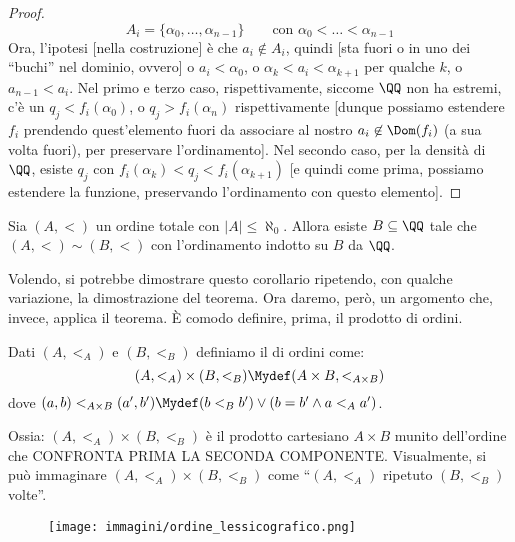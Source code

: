 \documentclass[11pt]{scrartcl}
\begin{document}
\begin{proof}
	\[ A_i = \{\alpha_0,\ldots,\alpha_{n-1}\} \qquad\text{con $\alpha_0<\ldots<\alpha_{n-1}$}
		\]
	Ora, l'ipotesi [nella costruzione] è che $a_i \not \in A_i$, quindi [sta fuori o in uno dei ``buchi'' nel dominio, ovvero] o $a_i <\alpha_0$, o $\alpha_k < a_i < \alpha_{k+1}$ per qualche $k$, o $a_{n-1}<a_i$. Nel primo e terzo caso, rispettivamente, siccome $\QQ$ non ha estremi, c'è un $q_j < f_i(\alpha_0)$, o $q_j > f_i(\alpha_n)$ rispettivamente
	[dunque possiamo estendere $f_i$ prendendo quest'elemento fuori da associare al nostro $a_i \not \in \Dom(f_i)$ (a sua volta fuori), per preservare l'ordinamento].
	Nel secondo caso, per la densità di $\QQ$, esiste $q_j$ con $f_i(\alpha_k)<q_j<f_i(\alpha_{k+1})$ [e quindi come prima, possiamo estendere la funzione, preservando l'ordinamento con questo elemento].
\end{proof}

\begin{corollary}
	Sia $(A,<)$ un ordine totale con $|A| \leq \aleph_0$. Allora esiste $B \subseteq \QQ$ tale che $(A,<) \sim (B,<)$ con l'ordinamento indotto su $B$ da $\QQ$.
\end{corollary}

\begin{note}
	Volendo, si potrebbe dimostrare questo corollario ripetendo, con qualche variazione, la dimostrazione del teorema. Ora daremo, però,
	un argomento che, invece, applica il teorema. È comodo definire, prima, il prodotto di ordini.
\end{note}

\begin{definition}
	Dati $(A,<_A)$ e $(B,<_B)$ definiamo il  di ordini come:
	\[ (A,<_A) \times (B,<_B) \Mydef (A \times B, <_{A \times B})
 		\]
	dove $(a,b) <_{A \times B} (a',b') \Mydef (b <_B b') \lor (b = b' \land a <_A a')$.
\end{definition}

Ossia: $(A,<_A) \times (B,<_B)$ è il prodotto cartesiano $A \times B$ munito dell'ordine che CONFRONTA PRIMA LA SECONDA COMPONENTE.
Visualmente, si può immaginare $(A,<_A) \times (B,<_B)$ come ``$(A,<_A)$ ripetuto $(B,<_B)$ volte''.

\begin{figure}[h]
	\centering
	\texttt{[image: immagini/ordine\_lessicografico.png]}
\end{figure}
\end{document}
